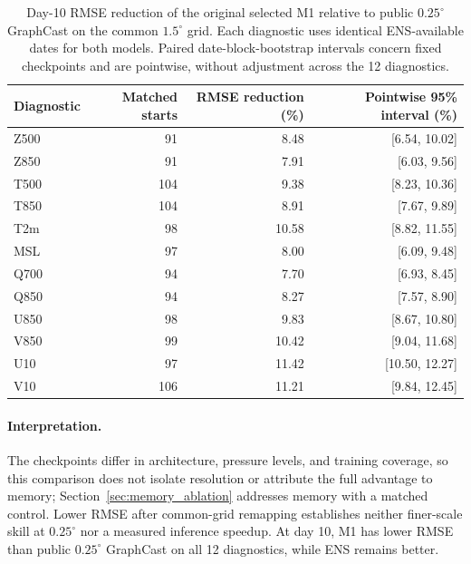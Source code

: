 \documentclass{article}
\newcommand{\vfourchange}[1]{{\color{blue}#1}}
\begin{document}
\begin{table}[!htbp]
    \centering
    \small
    \begingroup\color{blue}
    \begin{tabular}{lrrr}
        \toprule
        Diagnostic & Matched starts & RMSE reduction (\%) & Pointwise 95\% interval (\%) \\
        \midrule
        Z500 & 91 & 8.48 & [6.54, 10.02] \\
        Z850 & 91 & 7.91 & [6.03, 9.56] \\
        T500 & 104 & 9.38 & [8.23, 10.36] \\
        T850 & 104 & 8.91 & [7.67, 9.89] \\
        T2m & 98 & 10.58 & [8.82, 11.55] \\
        MSL & 97 & 8.00 & [6.09, 9.48] \\
        Q700 & 94 & 7.70 & [6.93, 8.45] \\
        Q850 & 94 & 8.27 & [7.57, 8.90] \\
        U850 & 98 & 9.83 & [8.67, 10.80] \\
        V850 & 99 & 10.42 & [9.04, 11.68] \\
        U10 & 97 & 11.42 & [10.50, 12.27] \\
        V10 & 106 & 11.21 & [9.84, 12.45] \\
        \bottomrule
    \end{tabular}
    \endgroup
    \caption{\vfourchange{Day-10 RMSE reduction of the original selected M1 relative to public $0.25^\circ$ GraphCast on the common $1.5^\circ$ grid. Each diagnostic uses identical ENS-available dates for both models. Paired date-block-bootstrap intervals concern fixed checkpoints and are pointwise, without adjustment across the 12 diagnostics.}}
    \label{tab:common_grid_intervals}
\end{table}

\FloatBarrier
\paragraph{\vfourchange{Interpretation.}}
\vfourchange{The checkpoints differ in architecture, pressure levels, and training coverage, so this comparison does not isolate resolution or attribute the full advantage to memory; Section~\ref{sec:memory_ablation} addresses memory with a matched control. Lower RMSE after common-grid remapping establishes neither finer-scale skill at $0.25^\circ$ nor a measured inference speedup. At day 10, M1 has lower RMSE than public $0.25^\circ$ GraphCast on all 12 diagnostics, while ENS remains better.}
\end{document}
